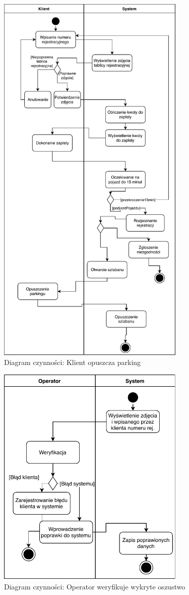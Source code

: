 \begin{figure}[H]
	\centering
	\includegraphics[width=90mm]{diagramy/DiagCzynWyjazd.pdf}
	\caption{Diagram czynności: Klient opuszcza parking \label{overflow}}
\end{figure}


\begin{figure}[H]
	\centering
	\includegraphics[width=90mm]{diagramy/DiagCzynWyswietlZdjecia.pdf}
	\caption{Diagram czynności: Operator weryfikuje wykryte oszustwo \label{overflow}}
\end{figure}

